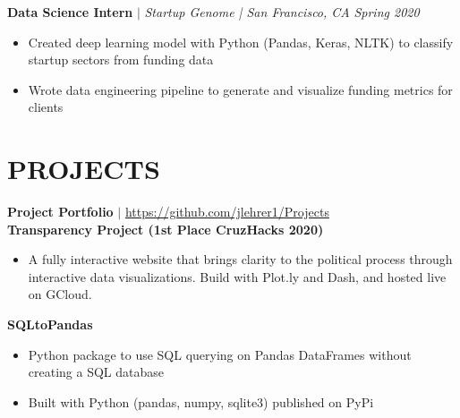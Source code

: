 \documentclass[margin]{res}
\begin{document}
\begin{resume}
   \textbf{Data Science Intern} $\mid$ \textit{Startup Genome | San Francisco, CA} \hfill {\sl Spring 2020}
    \begin{itemize}
        \item Created deep learning model with Python (Pandas, Keras, NLTK) to classify startup sectors from funding data 
        \item Wrote data engineering pipeline to generate and visualize funding metrics for clients
    \end{itemize} \vspace*{-10pt}
\section{PROJECTS}
    \textbf{Project Portfolio} $\mid$ \textcolor{blue}{\href{https://github.com/jlehrer1/Projects}{https://github.com/jlehrer1/Projects}} \vspace {2mm} \\
    \textbf{Transparency Project (1st Place CruzHacks 2020)}
    \begin{itemize}
        \item A fully interactive website that brings clarity to the political process through interactive data visualizations. Build with Plot.ly and Dash, and hosted live on GCloud.
    \end{itemize}\vspace*{-8pt}
    \textbf{SQLtoPandas}
    \begin{itemize}
        \item Python package to use SQL querying on Pandas DataFrames without creating a SQL database
        \item Built with Python (pandas, numpy, sqlite3) published on PyPi
    \end{itemize}\vspace*{-8pt}


\end{resume}
\end{document}
